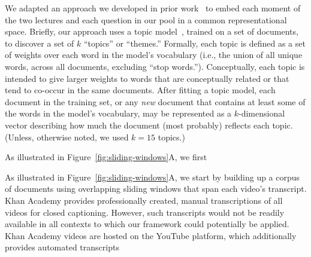 \documentclass[10pt]{article}
\newcommand{\questions}{S1}
\begin{document}
We adapted an approach we developed in prior work~\citep{HeusEtal21} to embed
each moment of the two lectures and each question in our pool in a common representational space.
Briefly, our approach uses a topic model~\citep[Latent Dirichlet Allocation;][]{BleiEtal03}, trained on a set
of documents, to discover a set of $k$ ``topics'' or ``themes.'' Formally, each
topic is defined as a set of weights over each word in the model's vocabulary
(i.e., the union of all unique words, across all documents, excluding ``stop
words.''). Conceptually, each topic is intended to give larger weights to words
that are conceptually related or that tend to co-occur in the same documents.
After fitting a topic model, each document in the training set, or any
\textit{new} document that contains at least some of the words in the model's
vocabulary, may be represented as a $k$-dimensional vector describing how much
the document (most probably) reflects each topic. (Unless, otherwise noted, we
used $k = 15$ topics.)

%
%

As illustrated in Figure~\ref{fig:sliding-windows}A, we first


As illustrated in Figure~\ref{fig:sliding-windows}A, we start by building up a
corpus of documents using overlapping sliding windows that span each video's
transcript. Khan Academy provides professionally created, manual transcriptions of all videos for closed captioning. However, such transcripts would not be readily available in all contexts to which our framework could potentially be applied. Khan Academy videos are hosted on the YouTube platform, which additionally provides automated transcripts
\end{document}
